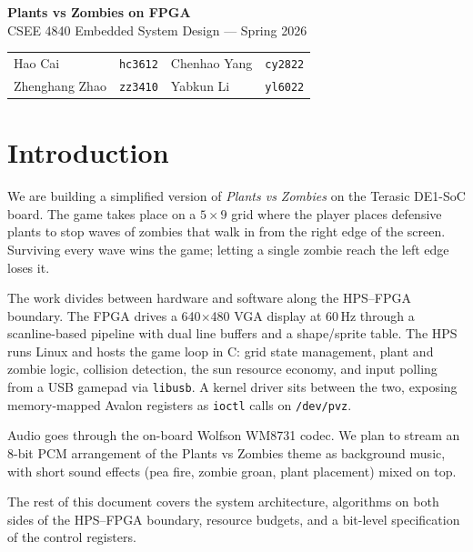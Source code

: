 \documentclass[11pt,letterpaper]{article}
\begin{document}
\begin{center}
  {\LARGE\bfseries Plants vs Zombies on FPGA}\\[0.6em]
  {\large CSEE 4840 Embedded System Design --- Spring 2026}\\[1.2em]
  \begin{tabular}{llll}
    Hao Cai & \texttt{hc3612} &
    Chenhao Yang & \texttt{cy2822} \\
    Zhenghang Zhao & \texttt{zz3410} &
    Yabkun Li & \texttt{yl6022} \\
  \end{tabular}
\end{center}

\tableofcontents
\newpage

\section{Introduction}
\label{sec:intro}

We are building a simplified version of \emph{Plants vs Zombies} on the
Terasic DE1-SoC board. The game takes place on a $5 \times 9$ grid where
the player places defensive plants to stop waves of zombies that walk in
from the right edge of the screen. Surviving every wave wins the game;
letting a single zombie reach the left edge loses it.

The work divides between hardware and software along the HPS--FPGA
boundary. The FPGA drives a 640$\times$480 VGA display at 60\,Hz
through a scanline-based pipeline with dual line buffers and a
shape/sprite table. The HPS runs Linux and hosts the game loop in C:
grid state management, plant and zombie logic, collision detection, the
sun resource economy, and input polling from a USB gamepad via
\texttt{libusb}. A kernel driver sits between the two, exposing
memory-mapped Avalon registers as \texttt{ioctl} calls on
\texttt{/dev/pvz}.

Audio goes through the on-board Wolfson WM8731 codec. We plan to stream
an 8-bit PCM arrangement of the Plants vs Zombies theme as background
music, with short sound effects (pea fire, zombie groan, plant placement)
mixed on top.

The rest of this document covers the system architecture, algorithms on
both sides of the HPS--FPGA boundary, resource budgets, and a bit-level
specification of the control registers.
\end{document}
